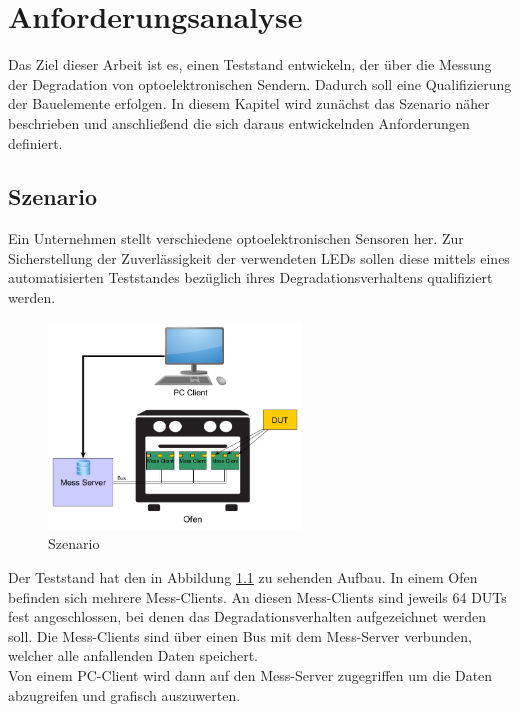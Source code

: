 
\chapter{Anforderungsanalyse}
\label{chapter_Anforderungsanalyse}
Das Ziel dieser Arbeit ist es, einen Teststand entwickeln, der über die Messung der Degradation von optoelektronischen Sendern. Dadurch soll eine Qualifizierung der Bauelemente erfolgen. In diesem Kapitel wird zunächst das Szenario näher beschrieben und anschließend die sich daraus entwickelnden Anforderungen definiert.

\section{Szenario}
Ein Unternehmen stellt verschiedene optoelektronischen Sensoren her. Zur Sicherstellung der Zuverlässigkeit der verwendeten \acp{LED} sollen diese mittels eines automatisierten Teststandes bezüglich ihres Degradationsverhaltens qualifiziert werden.


\begin{figure}[H]
\begin{center}
\includegraphics[width=0.6\textwidth]{img/general/Szenario.png}
\caption{Szenario}
\label{figure_Szenario}
\end{center}
\end{figure}

Der Teststand hat den in Abbildung \ref{figure_Szenario} zu sehenden Aufbau.
In einem Ofen befinden sich mehrere Mess-Clients. An diesen Mess-Clients sind jeweils 64 \acp{DUT} fest angeschlossen, bei denen das Degradationsverhalten aufgezeichnet werden soll.
Die Mess-Clients sind über einen Bus mit dem Mess-Server verbunden, welcher alle anfallenden Daten speichert.\\
Von einem PC-Client wird dann auf den Mess-Server zugegriffen um die Daten abzugreifen und grafisch auszuwerten.\\

